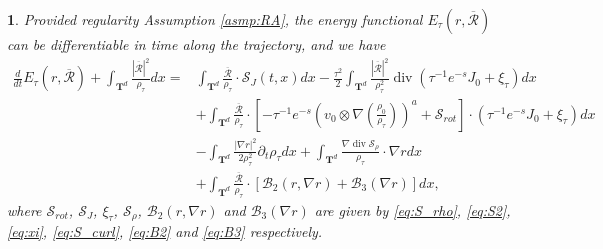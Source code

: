 \documentclass[english]{amsart}
\theoremstyle{plain}
\theoremstyle{definition}
\theoremstyle{remark}
\theoremstyle{plain}
\theoremstyle{plain}
\newtheorem{prop}[thm]{\protect\propositionname}
\theoremstyle{plain}
\providecommand{\propositionname}{Proposition}
\def\T{{\mathbf T}}%
\def\d{{\partial}}
\DeclareMathOperator{\diver}{div}
\numberwithin{equation}{section}
\begin{document}
\begin{prop}
Provided regularity Assumption \ref{asmp:RA}, the energy functional $E_\tau(r,\overline{\mathcal{R}})$ can be differentiable in time along the trajectory, and we have 
\begin{equation}\label{eq:dtEr}
\begin{aligned}
\frac{d}{dt}E_\tau(r,\overline{\mathcal{R}})+\int_{{\T^d}} \frac{|\overline{\mathcal{R}}|^2}{\rho_\tau}dx=&\int_{{\T^d}} \frac{\overline{\mathcal{R}}}{\rho_\tau}\cdot\mathcal{S}_J(t,x)dx-\frac{\tau^2}{2}\int_{\T^d}\frac{|\overline{\mathcal{R}}|^2}{\rho_\tau^2}\diver(\tau^{-1}e^{-s}J_0+\xi_\tau)dx\\
&+\int_{\T^d}\frac{\overline{\mathcal{R}}}{\rho_\tau}\cdot\left[-\tau^{-1} e^{-s}\left(v_0\otimes\nabla\left(\frac{\rho_0}{\rho_\tau}\right)\right)^a+\mathcal{S}_{rot}\right]\cdot(\tau^{-1}e^{-s}J_0+\xi_\tau)dx\\
&-\int_{\T^d}\frac{|\nabla r|^2}{2\rho_\tau^2}\d_t\rho_\tau dx+\int_{\T^d} \frac{\nabla\diver \mathcal{S}_\rho}{\rho_\tau}\cdot\nabla rdx\\
&+\int_{\T^d}\frac{\overline{\mathcal{R}}}{\rho_\tau}\cdot[\mathcal{B}_2(r,\nabla r)+\mathcal{B}_3(\nabla r)]dx,
\end{aligned}
\end{equation}
where $\mathcal{S}_{rot}$, $\mathcal{S}_J$, $\xi_\tau$, $\mathcal{S}_\rho$, $\mathcal{B}_2(r,\nabla r)$ and $\mathcal{B}_3(\nabla r)$ are given by \eqref{eq:S_rho}, \eqref{eq:S2}, \eqref{eq:xi}, \eqref{eq:S_curl}, \eqref{eq:B2} and \eqref{eq:B3} respectively.
\end{prop}
\end{document}
